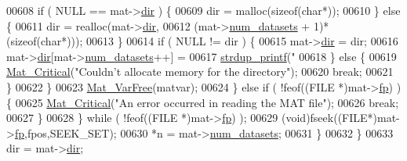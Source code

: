 \begin{DoxyCode}
{{{{{{{{{{{{{{{{{{{{00608                         \textcolor{keywordflow}{if} ( NULL == mat->\hyperlink{struct__mat__t_a1bc6c604459d0787801d5e53d365684c}{dir} ) \{
00609                             dir = malloc(\textcolor{keyword}{sizeof}(\textcolor{keywordtype}{char}*));
00610                         \} \textcolor{keywordflow}{else} \{
00611                             dir = realloc(mat->\hyperlink{struct__mat__t_a1bc6c604459d0787801d5e53d365684c}{dir},
00612                                 (mat->\hyperlink{struct__mat__t_af37d0ba323e65edb27ecd5a2f766a3a4}{num\_datasets} + 1)*(\textcolor{keyword}{sizeof}(\textcolor{keywordtype}{char}*)));
00613                         \}
00614                         \textcolor{keywordflow}{if} ( NULL != dir ) \{
00615                             mat->\hyperlink{struct__mat__t_a1bc6c604459d0787801d5e53d365684c}{dir} = dir;
00616                             mat->\hyperlink{struct__mat__t_a1bc6c604459d0787801d5e53d365684c}{dir}[mat->\hyperlink{struct__mat__t_af37d0ba323e65edb27ecd5a2f766a3a4}{num\_datasets}++] =
00617                                 \hyperlink{group__mat__util_ga291b08f933c75fb70e3736b669896ebd}{strdup\_printf}(\textcolor{stringliteral}{"%
00618                         \} \textcolor{keywordflow}{else} \{
00619                             \hyperlink{group__mat__util_gaf51f2bfbb5580f575e4dd79757e2b80c}{Mat\_Critical}(\textcolor{stringliteral}{"Couldn't allocate memory for the directory"});
00620                             \textcolor{keywordflow}{break};
00621                         \}
00622                     \}
00623                     \hyperlink{group___m_a_t_ga1d14716f7450530fd1c9d02413787f0e}{Mat\_VarFree}(matvar);
00624                 \} \textcolor{keywordflow}{else} \textcolor{keywordflow}{if} ( !feof((FILE *)mat->\hyperlink{struct__mat__t_a85f562e407ca9ad4d2a6e14f839432b7}{fp}) ) \{
00625                     \hyperlink{group__mat__util_gaf51f2bfbb5580f575e4dd79757e2b80c}{Mat\_Critical}(\textcolor{stringliteral}{"An error occurred in reading the MAT file"});
00626                     \textcolor{keywordflow}{break};
00627                 \}
00628             \} \textcolor{keywordflow}{while} ( !feof((FILE *)mat->\hyperlink{struct__mat__t_a85f562e407ca9ad4d2a6e14f839432b7}{fp}) );
00629             (void)fseek((FILE*)mat->\hyperlink{struct__mat__t_a85f562e407ca9ad4d2a6e14f839432b7}{fp},fpos,SEEK\_SET);
00630             *n = mat->\hyperlink{struct__mat__t_af37d0ba323e65edb27ecd5a2f766a3a4}{num\_datasets};
00631         \}
00632     \}
00633     dir = mat->\hyperlink{struct__mat__t_a1bc6c604459d0787801d5e53d365684c}{dir};
}}}}}}}}}}}}}}}}}}}}}
\end{DoxyCode}
